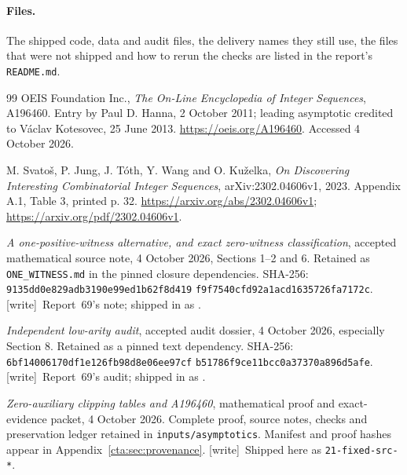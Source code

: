 \documentclass[11pt]{article}
\theoremstyle{definition}
\theoremstyle{remark}
\newcommand{\wtag}{\textup{[write]}}
\begin{document}
\paragraph{Files.} The shipped code, data and audit files, the delivery
names they still use, the files that were not shipped and how to rerun the
checks are listed in the report's \texttt{README.md}.
\begin{thebibliography}{99}
OEIS Foundation Inc., \emph{The On-Line Encyclopedia of Integer Sequences},
A196460. Entry by Paul D. Hanna, 2 October 2011; leading asymptotic
credited to V\'aclav Kotesovec, 25 June 2013.
\url{https://oeis.org/A196460}. Accessed 4 October 2026.

M. Svato\v{s}, P. Jung, J. T\'oth, Y. Wang and O. Ku\v{z}elka,
\emph{On Discovering Interesting Combinatorial Integer Sequences},
arXiv:2302.04606v1, 2023. Appendix A.1, Table 3, printed p. 32.
\url{https://arxiv.org/abs/2302.04606v1};
\url{https://arxiv.org/pdf/2302.04606v1}.

\emph{A one-positive-witness alternative, and exact zero-witness
classification}, accepted mathematical source note, 4 October 2026,
Sections 1--2 and 6. Retained as \texttt{ONE\_WITNESS.md} in the
pinned closure dependencies. SHA-256:
\texttt{9135dd0e829adb3190e99ed1b62f8d419}\newline
\texttt{f9f7540cfd92a1acd1635726fa7172c}.
\wtag\ Report~69's note; shipped in \cite{smc} as
.

\emph{Independent low-arity audit}, accepted audit dossier,
4 October 2026, especially Section 8. Retained as a pinned text dependency.
SHA-256:
\texttt{6bf14006170df1e126fb98d8e06ee97cf}\newline
\texttt{b51786f9ce11bcc0a37370a896d5afe}.
\wtag\ Report~69's audit; shipped in \cite{smc} as
.

\emph{Zero-auxiliary clipping tables and A196460}, mathematical proof
and exact-evidence packet, 4 October 2026. Complete proof, source notes,
checks and preservation ledger retained in \texttt{inputs/asymptotics}.
Manifest and proof hashes appear in Appendix~\ref{cta:sec:provenance}.
\wtag\ Shipped here as \texttt{21-fixed-src-*}.


\end{thebibliography}
\end{document}
